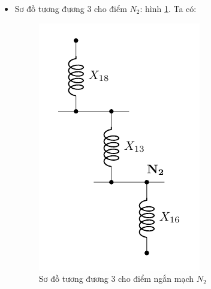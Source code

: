 \documentclass[12pt,a4paper]{article}
\begin{document}
\begin{itemize}
\begin{itemize}
\begin{itemize}
					\item Sơ đồ tương đương 3 cho điểm $N_2$: hình \ref{Fig:sodo-tuongduong-bt1-N2-3}. Ta có:
					\begin{figure}[!h]
						\begin{center}
							\includegraphics[scale=1]{figure-baitap-nganmach-1-N2-3.pdf} 
						\end{center}
					\caption{Sơ đồ tương đương 3 cho điểm ngắn mạch $N_2$} \label{Fig:sodo-tuongduong-bt1-N2-3}
					\end{figure}
					
				\end{itemize}
			

\end{itemize}
\end{itemize}
\end{document}
